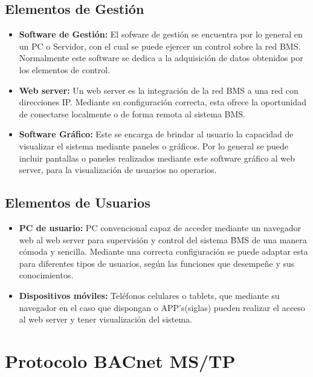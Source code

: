 \subsection{Elementos de Gestión}
\begin{itemize}
\item \textbf{Software de Gestión:}
El sofware de gestión se encuentra por lo general en un PC o Servidor, con el cual se puede ejercer un control sobre la red BMS. Normalmente este software se dedica a la adquisición de datos obtenidos por los elementos de control.
\item \textbf{Web server:}
Un web server es la integración de la red BMS a una red con direcciones IP. Mediante su configuración correcta, esta ofrece la oportunidad de conectarse localmente o de forma remota al sistema BMS.
\item \textbf{Software Gráfico:}
Este se encarga de brindar al usuario la capacidad de visualizar el sistema mediante paneles o gráficos. Por lo general se puede incluir pantallas o paneles realizados mediante este software gráfico al web server, para la visualización de usuarios no operarios.
\end{itemize}
\subsection{Elementos de Usuarios}
\begin{itemize}
\item \textbf{PC de usuario:}
PC convencional capaz de acceder mediante un navegador web al web server para supervisión y control del sistema BMS de una manera cómoda y sencilla. Mediante una correcta configuración se puede adaptar esta para diferentes tipos de usuarios, según las funciones que desempeñe y sus conocimientos.
\item \textbf{Dispositivos móviles:}
Teléfonos celulares o tablets, que mediante su navegador en el caso que dispongan o APP's(siglas) pueden realizar el acceso al web server y tener visualización del sistema.

\end{itemize}

\section{Protocolo BACnet MS/TP}






